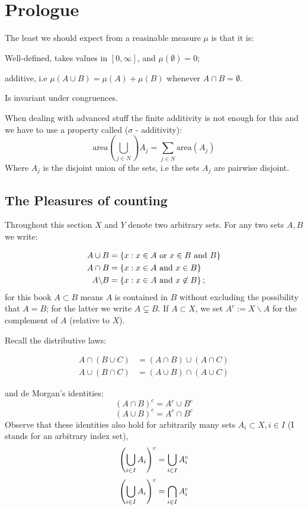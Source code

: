 \chapter{Prologue}
The least we should expect from a reasinable measure $ \mu $ is that it is:
\begin{center}
	Well-defined, takes values in $ [0, \infty ] $, and  $ \mu(\emptyset) = 0 $; 
	
	additive, i.e $ \mu( A \cup B) = \mu(A) + \mu(B) $ whenever $ A \cap B = \emptyset $.
	
	Is invariant under congruences.
\end{center}
When dealing with advanced stuff the finite additivity is not enough for this and we have to use a property called  ($\sigma $ - additivity):
\[ \textrm{area}(\bigcup_{j \in N})A_j = \sum_{j \in N} \textrm{area}(A_j) \]
Where $A_j$ is the disjoint union of the sets, i.e the sets $A_j$ are pairwise disjoint.

\section{The Pleasures of counting}
Throughout this section $X$ and $Y$ denote two arbitrary sets. For any two sets $A,B$ we write:

\begin{align*}
A \cup B &= \left\lbrace x : x\in A \textrm{ or } x\in B \textrm{ and } B \right\rbrace \\
A \cap B &= \left\lbrace  x : x\in A \textrm{ and } x \in B \right\rbrace \\
A \backslash B &= \left\lbrace  x : x \in A \textrm{ and } x \not \in B \right\rbrace;
\end{align*}
for this book $ A \subset B $ means $A$ is contained in $B$ without excluding the possibility that $ A = B $; for the latter we write $ A \subsetneq B$. If $ A \subset X$, we set $ A^c := X \backslash A$ for the complement of $A$ (relative to $X$).

Recall the distributive laws:

\begin{align*}
A \cap ( B \cup C) &= (A \cap B ) \cup (A \cap C) \\
A \cup ( B \cap C) &= ( A \cup B) \cap ( A \cup C) 
\end{align*}

and de Morgan's identities:
\[ (A \cap B)^c = A^c \cup B^c \]
\[ (A \cup B)^c = A^c \cap B^c \]
Observe that these identities also hold for arbitrarily many sets $ A_i \subset X, i \in I$ (I stands for an arbitrary index set),
\[ \left(  \bigcup_{i \in I} A_i  \right)^c = \bigcup_{i \in I} A_i^c \]
\[\left(  \bigcup_{i \in I} A_i \right)^c = \bigcap_{i \in I} A_i^c \]

